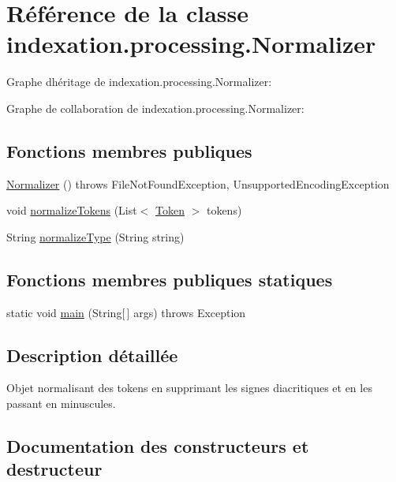 \hypertarget{classindexation_1_1processing_1_1Normalizer}{}\section{Référence de la classe indexation.\+processing.\+Normalizer}
\label{classindexation_1_1processing_1_1Normalizer}


Graphe d\textquotesingle{}héritage de indexation.\+processing.\+Normalizer\+:


Graphe de collaboration de indexation.\+processing.\+Normalizer\+:
\subsection*{Fonctions membres publiques}
\begin{DoxyCompactItemize}
\item 
\hyperlink{classindexation_1_1processing_1_1Normalizer_aef2c6986e93cb879a710a01c06d92d8c}{Normalizer} ()  throws File\+Not\+Found\+Exception, Unsupported\+Encoding\+Exception 	
\item 
void \hyperlink{classindexation_1_1processing_1_1Normalizer_a83b6aafd2e8ed00107c9fcb677190005}{normalize\+Tokens} (List$<$ \hyperlink{classindexation_1_1content_1_1Token}{Token} $>$ tokens)
\item 
String \hyperlink{classindexation_1_1processing_1_1Normalizer_ac8fd460c8d0bd9e58605d8eb857c3603}{normalize\+Type} (String string)
\end{DoxyCompactItemize}
\subsection*{Fonctions membres publiques statiques}
\begin{DoxyCompactItemize}
\item 
static void \hyperlink{classindexation_1_1processing_1_1Normalizer_a0fa449e8e4a59891a0c395d581c19307}{main} (String\mbox{[}$\,$\mbox{]} args)  throws Exception  	
\end{DoxyCompactItemize}


\subsection{Description détaillée}
Objet normalisant des tokens en supprimant les signes diacritiques et en les passant en minuscules. 

\subsection{Documentation des constructeurs et destructeur}
\mbox{\label{classindexation_1_1processing_1_1Normalizer_aef2c6986e93cb879a710a01c06d92d8c}} 

